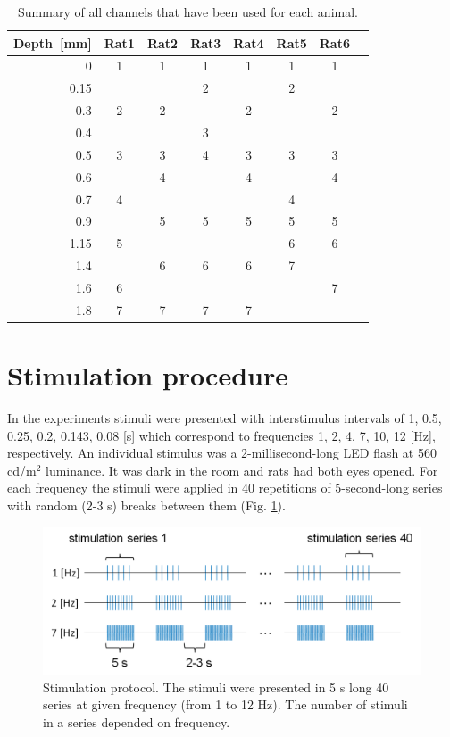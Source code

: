 \documentclass{pracalicmgr}
\begin{document}
 	\begin{table}[H]
	\caption{Summary of all channels that have been used for each animal.}
	\begin{center}
		\begin{tabularx}{0.9\textwidth}{R C C C C C C C}
			\toprule
			\textbf{Depth~[mm]} & \textbf{Rat1} & \textbf{Rat2} & \textbf{Rat3} & \textbf{Rat4} & \textbf{Rat5} & \textbf{Rat6} \\
			 & 1 & 1 & 1 & 1 & 1 & 1 \\
			0.15 &  &  & 2 & & 2&  \\
			0.3 & 2 & 2 &  & 2 & & 2 \\
			0.4 &  &  & 3 &  &  &  \\
			0.5 & 3 & 3 &4  & 3 & 3 & 3 \\
			0.6 & & 4 &  & 4 & & 4 \\
			0.7 & 4 &  &  &  & 4 &  \\
			0.9 & & 5 & 5 & 5 & 5& 5 \\
			1.15 & 5 &  &  &  & 6 & 6 \\
			1.4 & & 6 & 6 & 6 & 7 &  \\
			1.6 & 6 &  &  &  & & 7 \\
			1.8 & 7 & 7 & 7 & 7 & &  \\
			\bottomrule
		\end{tabularx}
	\end{center}
	\label{tab:chosen_chan}
	\end{table}
 	\newpage
 	\section{Stimulation procedure}
 	In the experiments stimuli were presented with interstimulus intervals of  1, 0.5, 0.25, 0.2, 0.143, 0.08 [s] which correspond to frequencies 1, 2, 4, 7, 10, 12 [Hz], respectively. An individual stimulus was a 2-millisecond-long LED flash at 560 cd/m$^2$ luminance. It was dark in the room and rats had both eyes opened. For each frequency the stimuli were applied in 40 repetitions of 5-second-long series with random (2-3 s) breaks between them (Fig. \ref{rys:stimuli}).
 	\begin{figure}[htbp]
 		\begin{center}
 			\includegraphics[scale=0.5]{paradigms.png}
 		\end{center}
 		\caption{ Stimulation protocol. The stimuli were presented in 5 s long 40 series at given frequency (from 1 to 12 Hz). The number of stimuli in a series depended on frequency.}
 		\label{rys:stimuli}
 	\end{figure} 
\end{document}
